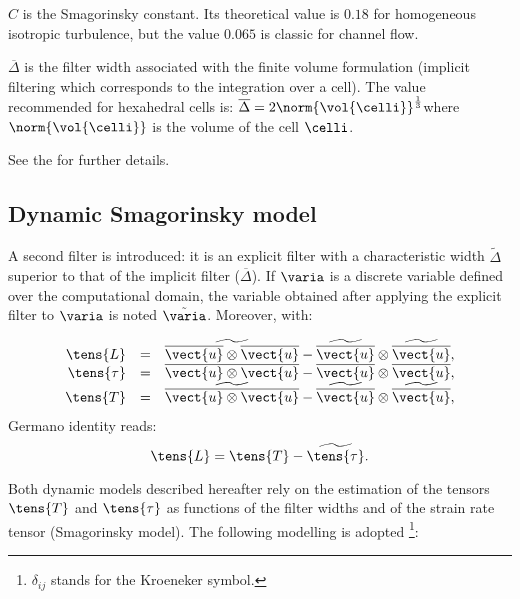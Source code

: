 $C$ is the Smagorinsky constant. Its theoretical value is $0.18$ for
homogeneous isotropic turbulence, but the value $0.065$ is classic for
channel flow.

$\overline{\Delta }$ is the filter width associated with the finite volume
formulation (implicit filtering which corresponds to the integration over a
cell). The value recommended for hexahedral cells is: $\overline{\Delta }
=2 \norm{\vol{\celli}}^{\frac{1}{3}}$where $\norm{\vol{\celli}}$ is the volume of the cell $\celli$.

See the  for further details.

\subsection{Dynamic Smagorinsky model}
A second filter is introduced: it is an explicit filter with a
characteristic width $\widetilde{\Delta }$ superior to that of the implicit
filter ($\overline{\Delta }$). If $\varia$ is a discrete variable defined over
the computational domain, the variable obtained after applying the explicit
filter to $\varia$ is noted $\tilde{\varia}$. Moreover, with:

\begin{equation}
\begin{array}{ r c l}
\tens{L} & = &\widetilde{\overline{\vect{u}} \otimes \overline{\vect{u}}}
-\widetilde{\overline{\vect{u}}} \otimes \widetilde{\overline{ \vect{u}}}, \\
\tens{\tau} & = & \overline{ \vect{u} \otimes \vect{u}}-\overline{\vect{u}} \otimes \overline{ \vect{u}}, \\
\tens{T} &= &\widetilde{\overline{ \vect{u} \otimes \vect{u}}}-\widetilde{\overline{\vect{u}}} \otimes
\widetilde{\overline{ \vect{u}}},
\end{array}
\end{equation}
Germano identity reads:
\begin{equation}
\tens{L} = \tens{T}-\widetilde{\tens{\tau}}.
\end{equation}

Both dynamic models described hereafter rely on the estimation of the tensors
$\tens{T}$ and $\tens{\tau}$ as functions of the filter widths and of the
strain rate tensor (Smagorinsky model). The following modelling is adopted%
\footnote{$\delta_{ij}$ stands for the Kroeneker symbol.}:

